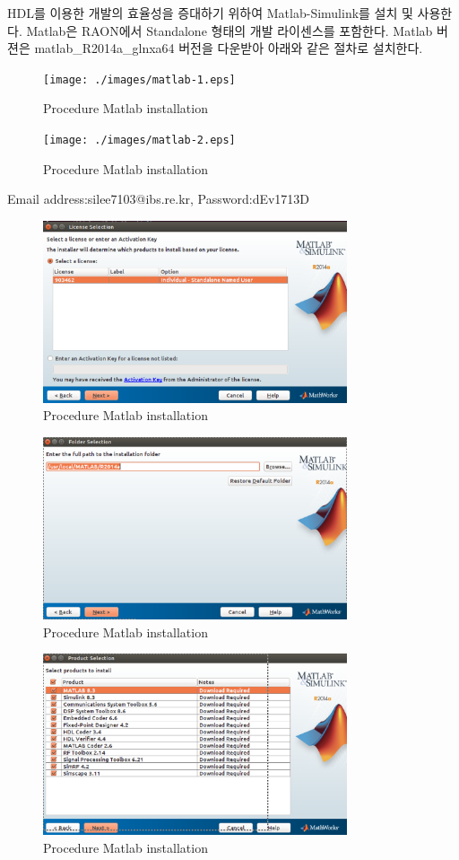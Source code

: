 \documentclass[11pt
  , a4paper
  , article
  , oneside
]{memoir}
\begin{document}
HDL를 이용한 개발의 효율성을 증대하기 위하여 Matlab-Simulink를 설치 및 사용한다. Matlab은 RAON에서 Standalone 형태의 개발 라이센스를 포함한다. Matlab 버젼은 matlab\_R2014a\_glnxa64 버전을 다운받아 아래와 같은 절차로 설치한다.

\begin{figure}[h!]
	\centering
	\texttt{[image: ./images/matlab-1.eps]}
	\caption{Procedure Matlab installation}
	\label{fig:install_1} 
\end{figure}
\begin{figure}[h!]
	\centering
	\texttt{[image: ./images/matlab-2.eps]}
	\caption{Procedure Matlab installation}
	\label{fig:install_2} 
\end{figure}
Email address:silee7103@ibs.re.kr, Password:dEv1713D
\hfil\break

\begin{figure}[h!]
	\centering
	\includegraphics[width=0.8\textwidth, height=0.4\textwidth]{./images/matlab-3.eps}
	\caption{Procedure Matlab installation}
	\label{fig:install_3} 
\end{figure}	


\begin{figure}[h!]
	\centering
	\includegraphics[width=0.8\textwidth, height=0.4\textwidth]{./images/matlab-4.eps}
	\caption{Procedure Matlab installation}
	\label{fig:install_4} 
\end{figure}	


\begin{figure}[h!]
	\centering
	\includegraphics[width=0.8\textwidth, height=0.4\textwidth]{./images/matlab-5.eps}
	\caption{Procedure Matlab installation}
	\label{fig:install_5} 
\end{figure}	
\end{document}
